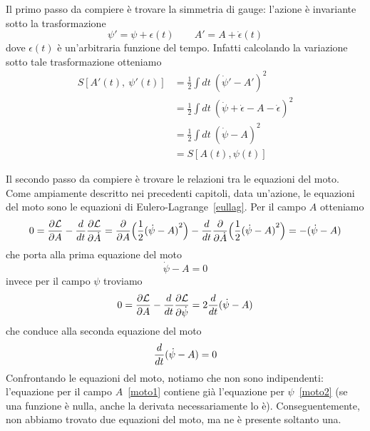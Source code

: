     Il primo passo da compiere è trovare la simmetria di gauge: l'azione è invariante sotto la trasformazione
    \begin{equation}\label{arbitraria}
        \psi' = \psi + \epsilon(t) \qquad A' = A + \dot \epsilon(t)
    \end{equation}
    dove $\epsilon(t)$ è un'arbitraria funzione del tempo. Infatti calcolando la variazione sotto tale trasformazione otteniamo 
    \begin{equation*}
    \begin{aligned}
        S[A'(t),~\psi'(t)] & = \frac{1}{2} \int dt ~ {(\dot \psi' - A')}^2 \\ & = \frac{1}{2} \int dt ~ {(\dot \psi + \dot \epsilon - A - \dot \epsilon )}^2 \\ & = \frac{1}{2} \int dt ~ {(\dot \psi - A)}^2 \\ & = S[A(t),\psi(t)]
    \end{aligned}
    \end{equation*}
    
    Il secondo passo da compiere è trovare le relazioni tra le equazioni del moto. Come ampiamente descritto nei precedenti capitoli, data un'azione, le equazioni del moto sono le equazioni di Eulero-Lagrange~\eqref{eullag}.
    Per il campo $A$ otteniamo 
    \begin{equation*}
        0 = \frac{\partial\mathcal L}{\partial A} - \frac{d}{dt} \frac{\partial\mathcal L}{\partial\dot A} = \frac{\partial}{\partial A} \Big (\frac{1}{2} {(\dot \psi - A)}^2 \Big ) - \frac{d}{dt} \frac{\partial}{\partial\dot A} \Big (\frac{1}{2} {(\dot \psi - A)}^2 \Big ) = - (\dot \psi - A)
    \end{equation*}
    che porta alla prima equazione del moto 
    \begin{equation} \label{moto1}
        \dot \psi - A = 0
    \end{equation}
    invece per il campo $\psi$ troviamo
    \begin{equation*}
        0 = \frac{\partial\mathcal L}{\partial A} - \frac{d}{dt} \frac{\partial\mathcal L}{\partial\dot \psi} = 2 \frac{d}{dt} (\dot \psi - A)
    \end{equation*}
    che conduce alla seconda equazione del moto 
    \begin{equation} \label{moto2}
        \frac{d}{dt} (\dot \psi - A) = 0
    \end{equation}
    Confrontando le equazioni del moto, notiamo che non sono indipendenti: l'equazione per il campo $A$~\eqref{moto1} contiene già l'equazione per $\psi$~\eqref{moto2} (se una funzione è nulla, anche la derivata necessariamente lo è). Conseguentemente, non abbiamo trovato due equazioni del moto, ma ne è presente soltanto una. 
    
